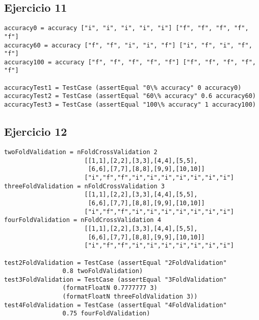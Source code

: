\documentclass[spanish, 10pt,a4paper]{article}
\numberwithin{equation}{section} %
\begin{document}
\subsection{Ejercicio 11}
\begin{lstlisting}
accuracy0 = accuracy ["i", "i", "i", "i", "i"] ["f", "f", "f", "f", "f"]
accuracy60 = accuracy ["f", "f", "i", "i", "f"] ["i", "f", "i", "f", "f"]
accuracy100 = accuracy ["f", "f", "f", "f", "f"] ["f", "f", "f", "f", "f"]

accuracyTest1 = TestCase (assertEqual "0\% accuracy" 0 accuracy0)
accuracyTest2 = TestCase (assertEqual "60\% accuracy" 0.6 accuracy60)
accuracyTest3 = TestCase (assertEqual "100\% accuracy" 1 accuracy100)
\end{lstlisting}

\subsection{Ejercicio 12}
\begin{lstlisting}
twoFoldValidation = nFoldCrossValidation 2 
				      [[1,1],[2,2],[3,3],[4,4],[5,5],
				       [6,6],[7,7],[8,8],[9,9],[10,10]]
				      ["i","f","f","i","i","i","i","i","i","i"]
threeFoldValidation = nFoldCrossValidation 3 
				      [[1,1],[2,2],[3,3],[4,4],[5,5],
				       [6,6],[7,7],[8,8],[9,9],[10,10]] 
				      ["i","f","f","i","i","i","i","i","i","i"]
fourFoldValidation = nFoldCrossValidation 4 
				      [[1,1],[2,2],[3,3],[4,4],[5,5],
				       [6,6],[7,7],[8,8],[9,9],[10,10]] 
				      ["i","f","f","i","i","i","i","i","i","i"]

test2FoldValidation = TestCase (assertEqual "2FoldValidation" 
				0.8 twoFoldValidation)
test3FoldValidation = TestCase (assertEqual "3FoldValidation" 
				(formatFloatN 0.7777777 3) 
				(formatFloatN threeFoldValidation 3))
test4FoldValidation = TestCase (assertEqual "4FoldValidation" 
				0.75 fourFoldValidation)
\end{lstlisting}
\end{document}
